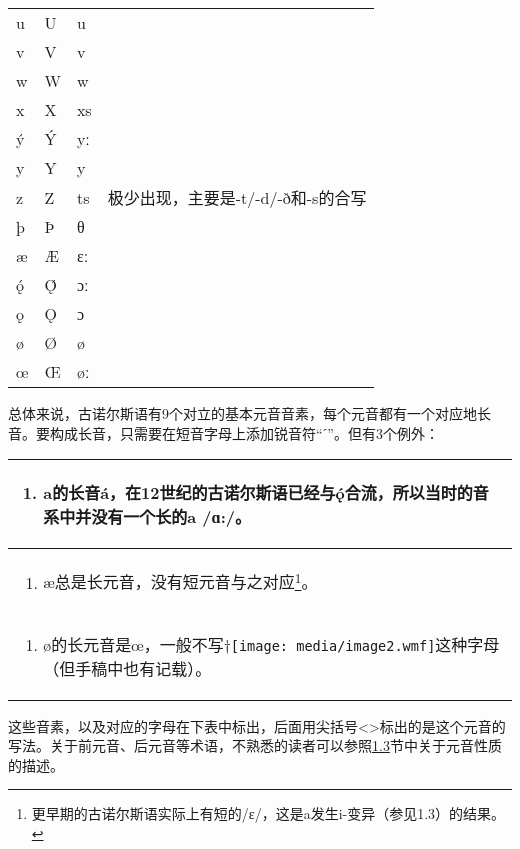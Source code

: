 \begin{longtable}{llll}
u & U & u & \\
v & V & v & \\
w & W & w & \\
x & X & xs & \\
ý & Ý & yː & \\
y & Y & y & \\
z & Z & ts & 极少出现，主要是-t/-d/-ð和-s的合写 \\
þ & Þ & θ & \\
æ & Æ & ɛː & \\
ǫ́ & Ǫ́ & ɔː & \\
ǫ & Ǫ & ɔ & \\
ø & Ø & ø & \\
œ & Œ & øː & \\
\end{longtable}

总体来说，古诺尔斯语有9个对立的基本元音音素，每个元音都有一个对应地长音。要构成长音，只需要在短音字母上添加锐音符``ˊ''。但有3个例外：

\begin{longtable}{l}
\toprule
\begin{enumerate}\def\labelenumi{\arabic{enumi}.}\item  a的长音á，在12世纪的古诺尔斯语已经与ǫ́合流，所以当时的音系中并没有一个长的a  /ɑ:/。\end{enumerate} \\
\midrule
\endhead
\bottomrule
\endfoot
\begin{minipage}[t]{\linewidth}\raggedright
\begin{enumerate}
\def\labelenumi{\arabic{enumi}.}
\setcounter{enumi}{1}
\item
  æ总是长元音，没有短元音与之对应\footnote{更早期的古诺尔斯语实际上有短的/ɛ/，这是a发生i-变异（参见1.3）的结果。}。
\end{enumerate}
\end{minipage} \\
\begin{minipage}[t]{\linewidth}\raggedright
\begin{enumerate}
\def\labelenumi{\arabic{enumi}.}
\setcounter{enumi}{2}
\item
  ø的长元音是œ，一般不写†\texttt{[image: media/image2.wmf]}这种字母（但手稿中也有记载）。
\end{enumerate}
\end{minipage} \\
\end{longtable}

这些音素，以及对应的字母在下表中标出，后面用尖括号\textless\textgreater 标出的是这个元音的写法。关于前元音、后元音等术语，不熟悉的读者可以参照\hyperref[ux53d8ux5143ux97f3]{1.3}节中关于元音性质的描述。

